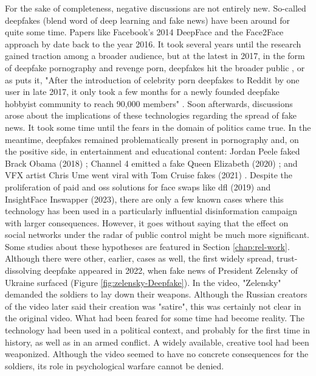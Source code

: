 \documentclass[
  a4paper,  %
  twoside,  %
  bibliography=totoc,
  headsepline,
  cleardoublepage=empty,
  parskip=half,
  draft=false
]{scrbook}
\begin{document}
For the sake of completeness, negative discussions are not entirely new. So-called deepfakes (blend word of deep learning and fake news) have been around for quite some time. Papers like Facebook's 2014 DeepFace \cite{taigmanDeepFaceClosingGap2014} and the Face2Face approach by \citet{thiesFace2FaceRealtimeFace2020} date back to the year 2016. It took several years until the research gained traction among a broader audience, but at the latest in 2017, in the form of deepfake pornography and revenge porn, deepfakes hit the broader public \cite{coleAIAssistedFakePorn2017}, or as \citeauthor{westerlundEmergenceDeepfakeTechnology2019a} puts it, "After the introduction of celebrity porn deepfakes to Reddit by one user in late 2017, it only took a few months for a newly founded deepfake hobbyist community to reach 90,000 members" \cite{westerlundEmergenceDeepfakeTechnology2019a}. Soon afterwards, discussions arose about the implications of these technologies regarding the spread of fake news. It took some time until the fears in the domain of politics came true. In the meantime, deepfakes remained problematically present in pornography and, on the positive side, in entertainment and educational content: Jordan Peele faked Brack Obama (2018) \cite{vincentWatchJordanPeele2018}; Channel 4 emitted a fake Queen Elizabeth (2020) \cite{DeepfakeQueenDeliver2020}; and VFX artist Chris Ume went viral with Tom Cruise fakes (2021) \cite{vincentTomCruiseDeepfake2021}. Despite the proliferation of paid and \gls{oss} solutions for face swaps like \gls{dfl} (2019) and InsightFace Inswapper (2023), there are only a few known cases where this technology has been used in a particularly influential disinformation campaign with larger consequences. However, it goes without saying that the effect on social networks under the radar of public control might be much more significant. Some studies about these hypotheses are featured in Section \ref{chap:rel-work}. \\
Although there were other, earlier, cases as well, the first widely spread, trust-dissolving deepfake appeared in 2022, when fake news of President Zelensky of Ukraine surfaced (Figure \ref{fig:zelensky-Deepfake}). In the video, "Zelensky" demanded the soldiers to lay down their weapons. Although the Russian creators of the video later said their creation was "satire", this was certainly not clear in the original video. What had been feared for some time had become reality. The technology had been used in a political context, and probably for the first time in history, as well as in an armed conflict. A widely available, creative tool had been weaponized. Although the video seemed to have no concrete consequences for the soldiers, its role in psychological warfare cannot be denied.
\end{document}
